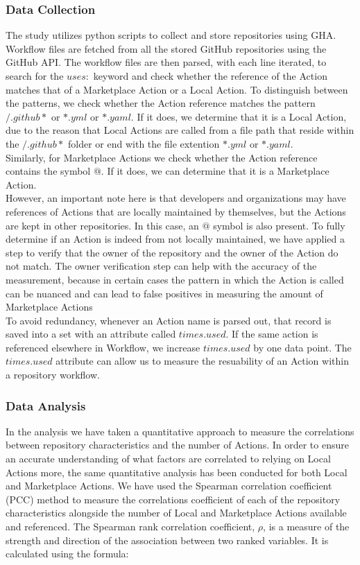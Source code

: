 \documentclass[conference]{IEEEtran}
\begin{document}
          \subsubsection{\textbf{Data Collection}}
            The study utilizes python scripts\cite{Marof2024}  to collect and store repositories using GHA. Workflow files are fetched from all the stored GitHub repositories using the GitHub API.  The workflow files are then parsed, with each line iterated, to search for the $uses:$ keyword and check whether the reference of the Action matches that of a Marketplace Action or a Local Action. To distinguish between the patterns, we check whether the Action reference matches the pattern $/.github*$ or $*.yml$ or $*.yaml$. If it does, we determine that it is a Local Action, due to the reason that Local Actions are called from a file path that reside within the $/.github*$ folder or end with the file extention $*.yml$ or $*.yaml$.
            \\ Similarly, for Marketplace Actions we check whether the Action reference contains the symbol $@$. If it does, we can determine that it is a Marketplace Action. \\ However, an important note here is that developers and organizations may have references of Actions that are locally maintained by themselves, but the Actions are kept in other repositories. In this case, an $@$ symbol is also present. To fully determine if an Action is indeed from not locally maintained, we have applied a step to verify that the owner of the repository and the owner of the Action do not match. The owner verification step can help with the accuracy of the measurement, because in certain cases the pattern in which the Action is called can be nuanced and can lead to false positives in measuring the amount of Marketplace Actions\\ 
            To avoid redundancy, whenever an Action name is parsed out, that record is saved into a set with an attribute called $times.used$. If the same action is referenced elsewhere in Workflow, we increase $times.used$ by one data point. The $times.used$ attribute can allow us to measure the resuability of an Action within a repository workflow.\\

          \subsubsection{\textbf{Data Analysis}}
            In the analysis we have taken a quantitative approach to measure the correlations between repository characteristics and the number of Actions. In order to ensure an accurate understanding of what factors are correlated to relying on Local Actions more, the same quantitative analysis has been conducted for both Local and Marketplace Actions. We have used the Spearman correlation coefficient (PCC) method to measure the correlations coefficient of each of the repository characteristics alongside the number of Local and Marketplace Actions available and referenced. The Spearman rank correlation coefficient, \(\rho\), is a measure of the strength and direction of the association between two ranked variables. It is calculated using the formula:
\end{document}
